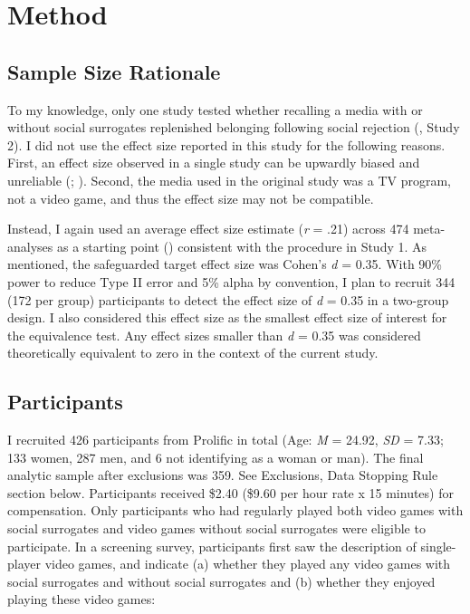 \documentclass[
]{udthesis}
\begin{document}
\section{Method}\label{method}

\subsection{Sample Size Rationale}\label{sample-size-rationale}

To my knowledge, only one study tested whether recalling a media with or without social surrogates replenished belonging following social rejection (, Study 2). I did not use the effect size reported in this study for the following reasons. First, an effect size observed in a single study can be upwardly biased and unreliable (; ). Second, the media used in the original study was a TV program, not a video game, and thus the effect size may not be compatible.

Instead, I again used an average effect size estimate (\emph{r} = .21) across 474 meta-analyses as a starting point () consistent with the procedure in Study 1. As mentioned, the safeguarded target effect size was Cohen's \emph{d} = 0.35. With 90\% power to reduce Type II error and 5\% alpha by convention, I plan to recruit 344 (172 per group) participants to detect the effect size of \emph{d} = 0.35 in a two-group design. I also considered this effect size as the smallest effect size of interest for the equivalence test. Any effect sizes smaller than \emph{d} = 0.35 was considered theoretically equivalent to zero in the context of the current study.

\subsection{Participants}\label{participants-5}

I recruited 426 participants from Prolific in total (Age: \emph{M} = 24.92, \emph{SD} = 7.33; 133 women, 287 men, and 6 not identifying as a woman or man). The final analytic sample after exclusions was 359. See Exclusions, Data Stopping Rule section below. Participants received \$2.40 (\$9.60 per hour rate x 15 minutes) for compensation. Only participants who had regularly played both video games with social surrogates and video games without social surrogates were eligible to participate. In a screening survey, participants first saw the description of single-player video games, and indicate (a) whether they played any video games with social surrogates and without social surrogates and (b) whether they enjoyed playing these video games:
\end{document}
